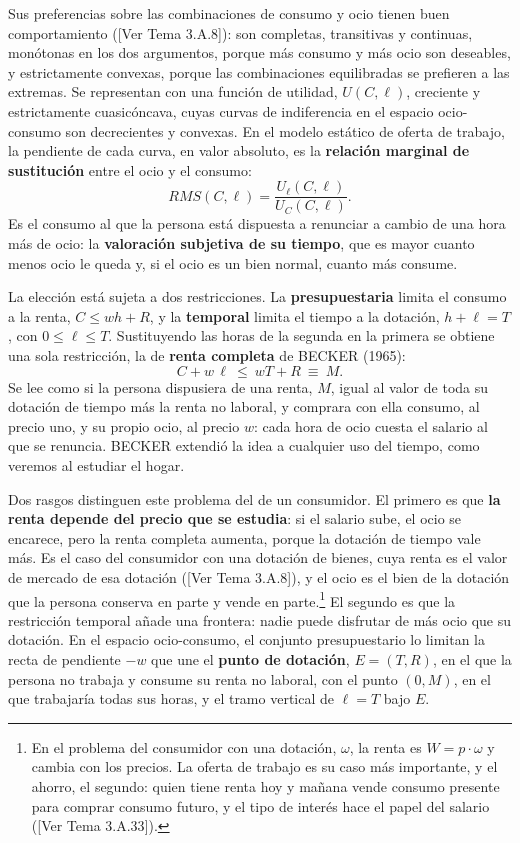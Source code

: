 \documentclass[10pt,a4paper]{article}
\newcommand{\authorfont}[1]{{\fontfamily{EBGaramond-TLF}\selectfont #1}}
\begin{document}
Sus preferencias sobre las combinaciones de consumo y ocio tienen buen comportamiento ([\authorfont{Ver Tema 3.A.8}]): son completas, transitivas y continuas, monótonas en los dos argumentos, porque más consumo y más ocio son deseables, y estrictamente convexas, porque las combinaciones equilibradas se prefieren a las extremas. Se representan con una función de utilidad, $U(C,\ell)$, creciente y estrictamente cuasicóncava, cuyas curvas de indiferencia en el espacio ocio-consumo son decrecientes y convexas. En el modelo estático de oferta de trabajo, la pendiente de cada curva, en valor absoluto, es la \textbf{relación marginal de sustitución} entre el ocio y el consumo:
$$RMS(C,\ell)=\frac{U_\ell(C,\ell)}{U_C(C,\ell)}.$$
Es el consumo al que la persona está dispuesta a renunciar a cambio de una hora más de ocio: la \textbf{valoración subjetiva de su tiempo}, que es mayor cuanto menos ocio le queda y, si el ocio es un bien normal, cuanto más consume.

La elección está sujeta a dos restricciones. La \textbf{presupuestaria} limita el consumo a la renta, $C\le wh+R$, y la \textbf{temporal} limita el tiempo a la dotación, $h+\ell=T$, con $0\le\ell\le T$. Sustituyendo las horas de la segunda en la primera se obtiene una sola restricción, la de \textbf{renta completa} de BECKER (1965):
$$C+w\,\ell\ \le\ wT+R\ \equiv\ M.$$
Se lee como si la persona dispusiera de una renta, $M$, igual al valor de toda su dotación de tiempo más la renta no laboral, y comprara con ella consumo, al precio uno, y su propio ocio, al precio $w$: cada hora de ocio cuesta el salario al que se renuncia. BECKER extendió la idea a cualquier uso del tiempo, como veremos al estudiar el hogar.

Dos rasgos distinguen este problema del de un consumidor. El primero es que \textbf{la renta depende del precio que se estudia}: si el salario sube, el ocio se encarece, pero la renta completa aumenta, porque la dotación de tiempo vale más. Es el caso del consumidor con una dotación de bienes, cuya renta es el valor de mercado de esa dotación ([\authorfont{Ver Tema 3.A.8}]), y el ocio es el bien de la dotación que la persona conserva en parte y vende en parte.\footnote{%
    En el problema del consumidor con una dotación, $\omega$, la renta es $W=p\cdot\omega$ y cambia con los precios. La oferta de trabajo es su caso más importante, y el ahorro, el segundo: quien tiene renta hoy y mañana vende consumo presente para comprar consumo futuro, y el tipo de interés hace el papel del salario ([\authorfont{Ver Tema 3.A.33}]).
} El segundo es que la restricción temporal añade una frontera: nadie puede disfrutar de más ocio que su dotación. En el espacio ocio-consumo, el conjunto presupuestario lo limitan la recta de pendiente $-w$ que une el \textbf{punto de dotación}, $E=(T,R)$, en el que la persona no trabaja y consume su renta no laboral, con el punto $(0,M)$, en el que trabajaría todas sus horas, y el tramo vertical de $\ell=T$ bajo $E$.
\end{document}
